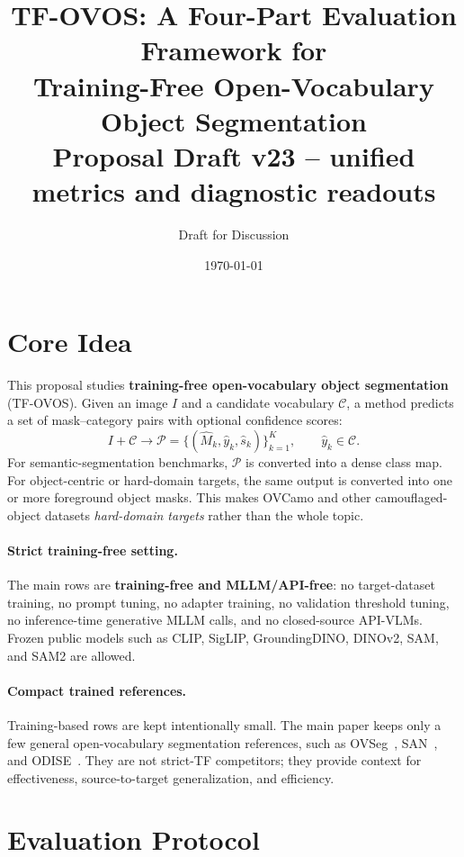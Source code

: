 \documentclass[11pt,a4paper]{article}
\title{\textbf{TF-OVOS}: A Four-Part Evaluation Framework for \\
       Training-Free Open-Vocabulary Object Segmentation \\
       \vspace{0.3em}
       \large{Proposal Draft v23 -- unified metrics and diagnostic readouts}}
\author{Draft for Discussion}
\date{\today}
\begin{document}
\maketitle

\section{Core Idea}

This proposal studies \textbf{training-free open-vocabulary object segmentation} (TF-OVOS). Given an image $I$ and a candidate vocabulary $\mathcal{C}$, a method predicts a set of mask--category pairs with optional confidence scores:
\begin{equation}
I+\mathcal{C}\rightarrow \mathcal{P}=\{(\hat{M}_k,\hat{y}_k,\hat{s}_k)\}_{k=1}^{K}, \qquad \hat{y}_k\in\mathcal{C}.
\end{equation}
For semantic-segmentation benchmarks, $\mathcal{P}$ is converted into a dense class map. For object-centric or hard-domain targets, the same output is converted into one or more foreground object masks. This makes OVCamo and other camouflaged-object datasets \emph{hard-domain targets} rather than the whole topic.

\paragraph{Strict training-free setting.}
The main rows are \textbf{training-free and MLLM/API-free}: no target-dataset training, no prompt tuning, no adapter training, no validation threshold tuning, no inference-time generative MLLM calls, and no closed-source API-VLMs. Frozen public models such as CLIP, SigLIP, GroundingDINO, DINOv2, SAM, and SAM2 are allowed.

\paragraph{Compact trained references.}
Training-based rows are kept intentionally small. The main paper keeps only a few general open-vocabulary segmentation references, such as OVSeg~\cite{ovseg2023}, SAN~\cite{san2023}, and ODISE~\cite{odise2023}. They are not strict-TF competitors; they provide context for effectiveness, source-to-target generalization, and efficiency.


\section{Evaluation Protocol}
\end{document}
